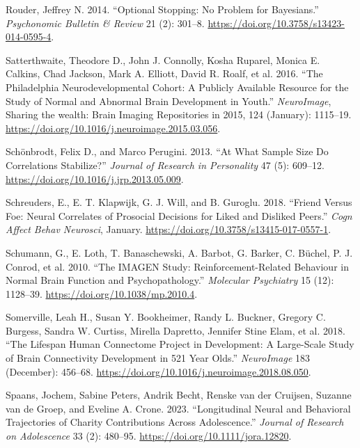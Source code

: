 \documentclass[
  letterpaper,
  DIV=11,
  numbers=noendperiod]{scrartcl}
\newlength{\cslhangindent}
\newenvironment{CSLReferences}[2] %
 {\begin{list}{}{%
  \setlength{\itemindent}{0pt}
  \setlength{\leftmargin}{0pt}
  \setlength{\parsep}{0pt}
  \ifodd #1
   \setlength{\leftmargin}{\cslhangindent}
   \setlength{\itemindent}{-1\cslhangindent}
  \fi
  \setlength{\itemsep}{#2\baselineskip}}}
 {\end{list}}
\begin{document}
\begin{CSLReferences}{1}{0}
Rouder, Jeffrey N. 2014. {``Optional Stopping: No Problem for
Bayesians.''} \emph{Psychonomic Bulletin \& Review} 21 (2): 301--8.
\url{https://doi.org/10.3758/s13423-014-0595-4}.

Satterthwaite, Theodore D., John J. Connolly, Kosha Ruparel, Monica E.
Calkins, Chad Jackson, Mark A. Elliott, David R. Roalf, et al. 2016.
{``The Philadelphia Neurodevelopmental Cohort: A Publicly Available
Resource for the Study of Normal and Abnormal Brain Development in
Youth.''} \emph{NeuroImage}, Sharing the wealth: Brain Imaging
Repositories in 2015, 124 (January): 1115--19.
\url{https://doi.org/10.1016/j.neuroimage.2015.03.056}.

Schönbrodt, Felix D., and Marco Perugini. 2013. {``At What Sample Size
Do Correlations Stabilize?''} \emph{Journal of Research in Personality}
47 (5): 609--12. \url{https://doi.org/10.1016/j.jrp.2013.05.009}.

Schreuders, E., E. T. Klapwijk, G. J. Will, and B. Guroglu. 2018.
{``Friend Versus Foe: Neural Correlates of Prosocial Decisions for Liked
and Disliked Peers.''} \emph{Cogn Affect Behav Neurosci}, January.
\url{https://doi.org/10.3758/s13415-017-0557-1}.

Schumann, G., E. Loth, T. Banaschewski, A. Barbot, G. Barker, C. Büchel,
P. J. Conrod, et al. 2010. {``The IMAGEN Study: Reinforcement-Related
Behaviour in Normal Brain Function and Psychopathology.''}
\emph{Molecular Psychiatry} 15 (12): 1128--39.
\url{https://doi.org/10.1038/mp.2010.4}.

Somerville, Leah H., Susan Y. Bookheimer, Randy L. Buckner, Gregory C.
Burgess, Sandra W. Curtiss, Mirella Dapretto, Jennifer Stine Elam, et
al. 2018. {``The Lifespan Human Connectome Project in Development: A
Large-Scale Study of Brain Connectivity Development in 5{\textendash}21
Year Olds.''} \emph{NeuroImage} 183 (December): 456--68.
\url{https://doi.org/10.1016/j.neuroimage.2018.08.050}.

Spaans, Jochem, Sabine Peters, Andrik Becht, Renske van der Cruijsen,
Suzanne van de Groep, and Eveline A. Crone. 2023. {``Longitudinal Neural
and Behavioral Trajectories of Charity Contributions Across
Adolescence.''} \emph{Journal of Research on Adolescence} 33 (2):
480--95. \url{https://doi.org/10.1111/jora.12820}.


\end{CSLReferences}
\end{document}
